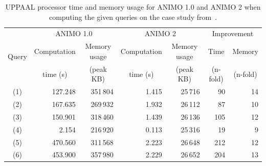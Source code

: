 \documentclass{bmcart}
\def\animo2{ANIMO 2}
\begin{document}
\begin{backmatter}


\begin{table}[h!]
\scriptsize
  \begin{center}
    \begin{tabular}{|c||r|r||r|r||r|r|}
      \hline
       \multirow{3}{*}{Query} & \multicolumn{2}{c||}{ANIMO 1.0}	   & \multicolumn{2}{c||}{\animo2{}} & \multicolumn{2}{c|}{Improvement}\\
      \cline{2-7}
       & \multicolumn{1}{c|}{Computation} & \multicolumn{1}{c||}{Memory usage} & \multicolumn{1}{c|}{Computation} & \multicolumn{1}{c||}{Memory usage} & \multicolumn{1}{c|}{Time} & \multicolumn{1}{c|}{Memory} \\
       & \multicolumn{1}{c|}{time (s)}    & \multicolumn{1}{c||}{(peak KB)}    & \multicolumn{1}{c|}{time (s)} & \multicolumn{1}{c||}{(peak KB)} & \multicolumn{1}{c|}{(n-fold)} & \multicolumn{1}{c|}{(n-fold)}\\
      \hline
      \hline
      (1) & 127.248 & 351\,{}804 & 1.415 & 25\,{}716 & 90 & 14 \\
      \hline
      (2) & 167.635 & 269\,{}932 & 1.932 & 26\,{}112 & 87 & 10 \\
      \hline
      (3) & 150.901 & 318\,{}460 & 1.439 & 26\,{}136 & 105 & 12 \\
      \hline
      (4) & 2.154 & 216\,{}920 & 0.113 & 25\,{}316 & 19 & 9 \\
      \hline
      (5) & 470.560 & 311\,{}568 & 2.223 & 26\,{}648 & 212 & 12 \\
      \hline
      (6) & 453.900 & 357\,{}980 & 2.229 & 26\,{}652 & 204 & 13 \\
      \hline
    \end{tabular}
  \end{center}
  \caption{UPPAAL processor time and memory usage for ANIMO 1.0 and \animo2{} when computing
  the given queries on the case study from~\cite{animo-bibe}.\label{tab:model-checking}}
\end{table}




\end{backmatter}
\end{document}
